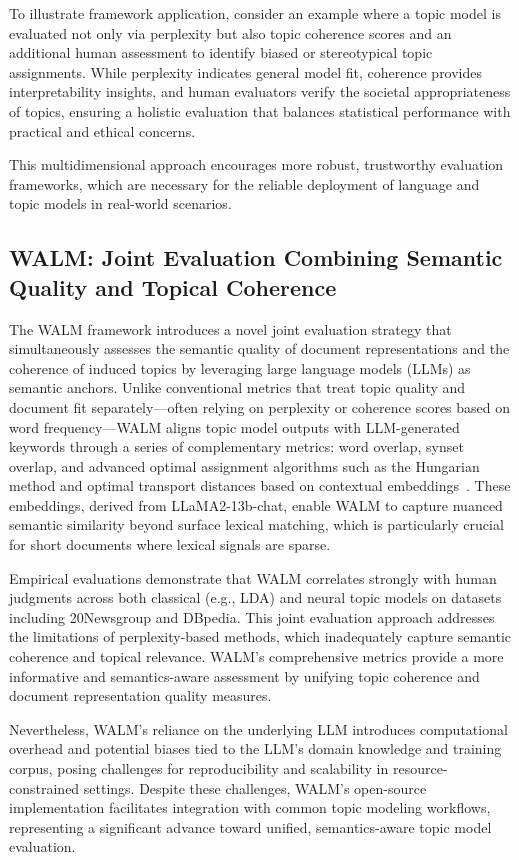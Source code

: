 \documentclass[sigconf]{acmart}
\begin{document}
To illustrate framework application, consider an example where a topic model is evaluated not only via perplexity but also topic coherence scores and an additional human assessment to identify biased or stereotypical topic assignments. While perplexity indicates general model fit, coherence provides interpretability insights, and human evaluators verify the societal appropriateness of topics, ensuring a holistic evaluation that balances statistical performance with practical and ethical concerns.

This multidimensional approach encourages more robust, trustworthy evaluation frameworks, which are necessary for the reliable deployment of language and topic models in real-world scenarios.

\subsection{WALM: Joint Evaluation Combining Semantic Quality and Topical Coherence}

The WALM framework introduces a novel joint evaluation strategy that simultaneously assesses the semantic quality of document representations and the coherence of induced topics by leveraging large language models (LLMs) as semantic anchors. Unlike conventional metrics that treat topic quality and document fit separately—often relying on perplexity or coherence scores based on word frequency—WALM aligns topic model outputs with LLM-generated keywords through a series of complementary metrics: word overlap, synset overlap, and advanced optimal assignment algorithms such as the Hungarian method and optimal transport distances based on contextual embeddings~\cite{ref47}. These embeddings, derived from LLaMA2-13b-chat, enable WALM to capture nuanced semantic similarity beyond surface lexical matching, which is particularly crucial for short documents where lexical signals are sparse.

Empirical evaluations demonstrate that WALM correlates strongly with human judgments across both classical (e.g., LDA) and neural topic models on datasets including 20Newsgroup and DBpedia. This joint evaluation approach addresses the limitations of perplexity-based methods, which inadequately capture semantic coherence and topical relevance. WALM’s comprehensive metrics provide a more informative and semantics-aware assessment by unifying topic coherence and document representation quality measures.

Nevertheless, WALM’s reliance on the underlying LLM introduces computational overhead and potential biases tied to the LLM’s domain knowledge and training corpus, posing challenges for reproducibility and scalability in resource-constrained settings. Despite these challenges, WALM’s open-source implementation facilitates integration with common topic modeling workflows, representing a significant advance toward unified, semantics-aware topic model evaluation.
\end{document}

